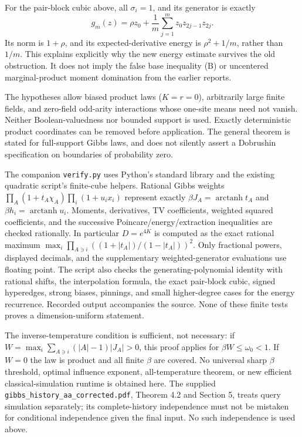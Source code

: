 \documentclass[11pt]{article}
\begin{document}
For the pair-block cubic above, all $\sigma_i=1$, and its generator is
exactly
\[
 g_m(z)=\rho z_0+\frac1m\sum_{j=1}^m z_0z_{2j-1}z_{2j}.
\]
Its norm is $1+\rho$, and its expected-derivative energy is
$\rho^2+1/m$, rather than $1/m$. This explains explicitly why the
new energy estimate survives the old obstruction. It does not imply
the false base inequality (B) or uncentered marginal-product moment
domination from the earlier reports.

The hypotheses allow biased product laws ($K=r=0$), arbitrarily
large finite fields, and zero-field odd-arity interactions whose
one-site means need not vanish. Neither Boolean-valuedness nor
bounded support is used. Exactly deterministic product coordinates
can be removed before application. The general theorem is stated
for full-support Gibbs laws, and does not silently assert a Dobrushin
specification on boundaries of probability zero.

The companion \texttt{verify.py} uses Python's standard library and
the existing quadratic script's finite-cube helpers. Rational Gibbs
weights $\prod_A(1+t_A\chi_A)\prod_i(1+u_ix_i)$ represent exactly
$\beta J_A=\operatorname{arctanh}t_A$ and
$\beta h_i=\operatorname{arctanh}u_i$. Moments, derivatives, TV
coefficients, weighted squared coefficients, and the successive
Poincare/energy/extraction inequalities are checked rationally.
In particular $D=e^{4K}$ is computed as the exact rational maximum
$\max_i\prod_{A\ni i}((1+|t_A|)/(1-|t_A|))^2$.
Only fractional powers, displayed decimals, and the supplementary
weighted-generator evaluations use floating point. The script also
checks the generating-polynomial identity with rational shifts,
the interpolation formula, the exact pair-block cubic, signed
hyperedges, strong biases, pinnings, and small higher-degree cases
for the energy recurrence. Recorded output accompanies the source.
None of these finite tests proves a dimension-uniform statement.

The inverse-temperature condition is sufficient, not necessary:
if $W=\max_i\sum_{A\ni i}(|A|-1)|J_A|>0$, this proof applies
for $\beta W\le\omega_0<1$. If $W=0$ the law is product and all
finite $\beta$ are covered. No universal sharp $\beta$ threshold,
optimal influence exponent, all-temperature theorem, or new
efficient classical-simulation runtime is obtained here.
The supplied \texttt{gibbs\_history\_aa\_corrected.pdf}, Theorem 4.2
and Section 5, treats query simulation separately; its complete-history
independence must not be mistaken for conditional independence given
the final input. No such independence is used above.
\end{document}

